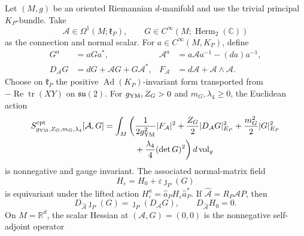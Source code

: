 \begin{theorem}
\label{hnsp-intrinsic-gauge-scalar-theorem}
Let \((M,g)\) be an oriented Riemannian \(d\)-manifold and use the trivial
principal \(K_P\)-bundle.  Take
\begin{equation}
 \mathcal A\in\Omega^1(M;\mathfrak k_P),\qquad
 G\in C^\infty(M;\operatorname{Herm}_2(\mathbb C))
 \label{hnsp-intrinsic-fields}
\end{equation}
as the connection and normal scalar.  For
\(a\in C^\infty(M,K_P)\), define
\begin{align}
 G^a&=aGa^*,&
 \mathcal A^a&=a\mathcal A a^{-1}-(da)a^{-1},
 \label{hnsp-intrinsic-gauge-action}\\
 D_{\mathcal A}G&=dG+\mathcal A G+G\mathcal A^*,&
 F_{\mathcal A}&=d\mathcal A+\mathcal A\wedge\mathcal A.
 \label{hnsp-intrinsic-covariant-objects}
\end{align}
Choose on \(\mathfrak k_P\) the positive
\(\operatorname{Ad}(K_P)\)-invariant form transported from
\(-\operatorname{Re}\operatorname{tr}(XY)\) on \(\mathfrak{su}(2)\).  For
\(g_{\rm YM},Z_G>0\) and \(m_G,\lambda_4\geq0\), the Euclidean action
\begin{equation}
 \begin{split}
 S^{\rm cpt}_{g_{\rm YM},Z_G,m_G,\lambda_4}[\mathcal A,G]
 =\int_M\bigg(&\frac1{2g_{\rm YM}^2}|F_{\mathcal A}|^2
 +\frac {Z_G}2|D_{\mathcal A}G|_{E_P}^2
 +\frac{m_G^2}{2}|G|_{E_P}^2\\
 &+\frac{\lambda_4}4(\det G)^2\bigg)\,d\operatorname{vol}_g
 \end{split}
 \label{hnsp-intrinsic-positive-action}
\end{equation}
is nonnegative and gauge invariant.  The associated normal-matrix field
\begin{equation}
 H_\varepsilon=H_0+\varepsilon\jmath_P(G)
 \label{hnsp-intrinsic-normal-field}
\end{equation}
is equivariant under the lifted action
\(H_\varepsilon^a=\widehat a_P H_\varepsilon\widehat a_P^*\).  If
\(\widehat{\mathcal A}=R_P\mathcal A P\), then
\begin{equation}
 D_{\widehat{\mathcal A}}\jmath_P(G)
 =\jmath_P(D_{\mathcal A}G),\qquad
 D_{\widehat{\mathcal A}}H_0=0.
 \label{hnsp-intrinsic-connection-intertwining}
\end{equation}
On \(M=\mathbb R^d\), the scalar Hessian at
\((\mathcal A,G)=(0,0)\) is the nonnegative self-adjoint operator
\begin{equation}

\end{equation}
\end{theorem}

